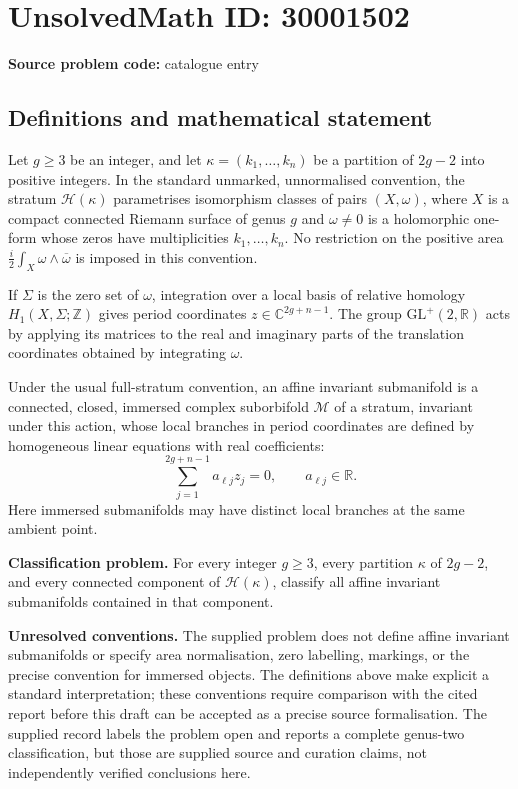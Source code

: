\documentclass[11pt]{article}
\newcommand{\Z}{\mathbb{Z}}
\newcommand{\R}{\mathbb{R}}
\newcommand{\C}{\mathbb{C}}
\begin{document}
\section*{UnsolvedMath ID: 30001502}
\textbf{Source problem code:} catalogue entry
\subsection{Definitions and mathematical statement}
Let \(g\geq 3\) be an integer, and let \(\kappa=(k_1,\ldots,k_n)\) be a partition of \(2g-2\) into positive integers. In the standard unmarked, unnormalised convention, the stratum \(\mathcal H(\kappa)\) parametrises isomorphism classes of pairs \((X,\omega)\), where \(X\) is a compact connected Riemann surface of genus \(g\) and \(\omega\neq 0\) is a holomorphic one-form whose zeros have multiplicities \(k_1,\ldots,k_n\). No restriction on the positive area \(\frac{i}{2}\int_X\omega\wedge\overline\omega\) is imposed in this convention.

If \(\Sigma\) is the zero set of \(\omega\), integration over a local basis of relative homology \(H_1(X,\Sigma;\Z)\) gives period coordinates \(z\in\C^{2g+n-1}\). The group \(\mathrm{GL}^{+}(2,\R)\) acts by applying its matrices to the real and imaginary parts of the translation coordinates obtained by integrating \(\omega\).

Under the usual full-stratum convention, an affine invariant submanifold is a connected, closed, immersed complex suborbifold \(\mathcal M\) of a stratum, invariant under this action, whose local branches in period coordinates are defined by homogeneous linear equations with real coefficients:
\[
\sum_{j=1}^{2g+n-1}a_{\ell j}z_j=0,
\qquad a_{\ell j}\in\R.
\]
Here immersed submanifolds may have distinct local branches at the same ambient point.

\textbf{Classification problem.} For every integer \(g\geq 3\), every partition \(\kappa\) of \(2g-2\), and every connected component of \(\mathcal H(\kappa)\), classify all affine invariant submanifolds contained in that component.

\textbf{Unresolved conventions.} The supplied problem does not define affine invariant submanifolds or specify area normalisation, zero labelling, markings, or the precise convention for immersed objects. The definitions above make explicit a standard interpretation; these conventions require comparison with the cited report before this draft can be accepted as a precise source formalisation. The supplied record labels the problem open and reports a complete genus-two classification, but those are supplied source and curation claims, not independently verified conclusions here.
\end{document}
